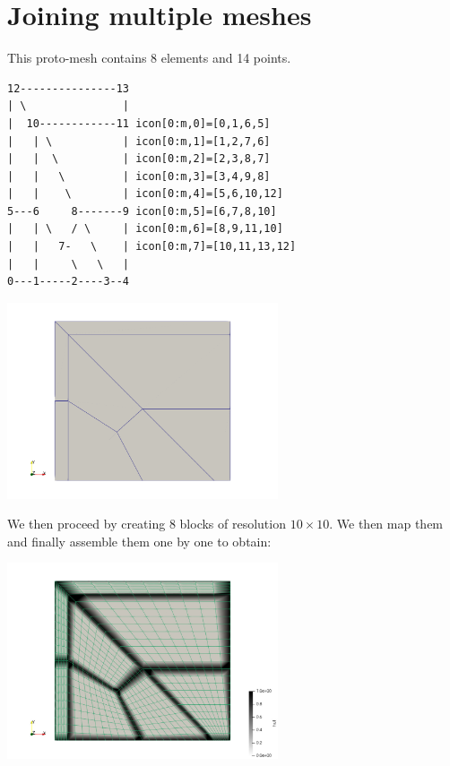 \section*{Joining multiple meshes}

This proto-mesh contains 8 elements and 14 points.

\begin{verbatim}
12---------------13
| \               |
|  10------------11 icon[0:m,0]=[0,1,6,5]
|   | \           | icon[0:m,1]=[1,2,7,6]
|   |  \          | icon[0:m,2]=[2,3,8,7]
|   |   \         | icon[0:m,3]=[3,4,9,8]
|   |    \        | icon[0:m,4]=[5,6,10,12]
5---6     8-------9 icon[0:m,5]=[6,7,8,10]    
|   | \   / \     | icon[0:m,6]=[8,9,11,10]
|   |   7-   \    | icon[0:m,7]=[10,11,13,12]
|   |     \   \   | 
0---1-----2----3--4
\end{verbatim}

\begin{center}
\includegraphics[width=8cm]{python_codes/fieldstone_149/results/meshing/mesh}
\end{center}

We then proceed by creating 8 blocks of resolution $10\times 10$. 
We then map them and finally assemble them one by one to obtain:

\begin{center}
\includegraphics[width=8cm]{python_codes/fieldstone_149/results/meshing/vkkmesh}
\end{center}

